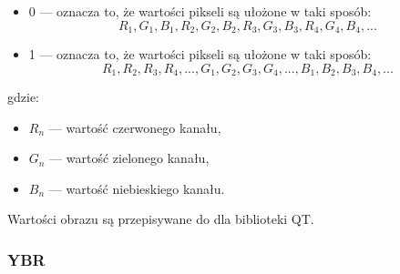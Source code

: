 \begin{itemize}
    \item 0 --- oznacza to, że wartości pikseli są ułożone w taki sposób:
        \[R_1, G_1, B_1, R_2, G_2, B_2, R_3, G_3, B_3, R_4, G_4, B_4,  ...\]
    \item 1 --- oznacza to, że wartości pikseli są ułożone w taki sposób:
        \[R_1, R_2, R_3, R_4, ... , G_1, G_2, G_3, G_4, ..., B_1, B_2, B_3, B_4, ...\]
\end{itemize}
gdzie:
\begin{itemize}
    \item $R_n$ --- wartość czerwonego kanału,
    \item $G_n$ --- wartość zielonego kanału,
    \item $B_n$ --- wartość niebieskiego kanału.
\end{itemize}

Wartości obrazu są przepisywane do  dla biblioteki QT.

\subsubsection{YBR}

